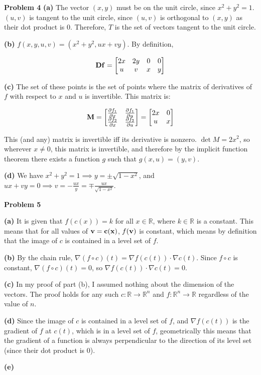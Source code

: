 \documentclass[11pt]{amsart}
\DeclareMathOperator{\detm}{det}
\newcommand{\problem}[1]{\bigskip\noindent\textbf{Problem #1}}
\newcommand{\ppart}[1]{\bigskip\textbf{(#1)}}
\begin{document}
\problem{4}
\ppart{a}
The vector $(x, y)$ must be on the unit circle, since $x^2 + y^2 = 1$. $(u, v)$ is tangent to the unit circle, since $(u, v)$ is orthogonal to $(x, y)$ as their dot product is $0$. Therefore, $T$ is the set of vectors tangent to the unit circle.

\ppart{b}
$f(x, y, u, v) = (x^2 + y^2, ux + vy)$. By definition,

$$
\bf{D}f =
\begin{bmatrix}
	2x & 2y & 0 & 0 \\
	u & v & x & y
\end{bmatrix}
$$

\ppart{c}
The set of these points is the set of points where the matrix of derivatives of $f$ with respect to $x$ and $u$ is invertible. This matrix is:

$$
\bf{M} =
\begin{bmatrix}
	\frac{\partial f_1}{\partial x} & \frac{\partial f_1}{\partial u} \\
	\frac{\partial f_2}{\partial x} & \frac{\partial f_2}{\partial u}
\end{bmatrix}
=
\begin{bmatrix}
	2x & 0 \\
	u & x
\end{bmatrix}
$$

This (and any) matrix is invertible iff its derivative is nonzero. $\detm M = 2x^2$, so wherever $x \neq 0$, this matrix is invertible, and therefore by the implicit function theorem there exists a function $g$ such that $g(x, u) = (y, v)$.

\ppart{d}
We have $x^2 + y^2 = 1 \implies y = \pm \sqrt{1 - x^2}$, and $ux + vy = 0 \implies v = -\frac{ux}{y} = \mp \frac{ux}{\sqrt{1 - x^2}}$.

\problem{5}

\ppart{a}
It is given that $f(c(x)) = k$ for all $x \in \mathbb{R}$, where $k \in \mathbb{R}$ is a constant. This means that for all values of $\bf{v} = c(x)$, $f(\bf{v})$ is constant, which means by definition that the image of $c$ is contained in a level set of $f$.

\ppart{b}
By the chain rule, $\nabla(f \circ c)(t) = \nabla f(c(t)) \cdot \nabla c(t)$. Since $f \circ c$ is constant, $\nabla(f \circ c)(t) = 0$, so $\nabla f(c(t)) \cdot \nabla c(t) = 0$.

\ppart{c}
In my proof of part (b), I assumed nothing about the dimension of the vectors. The proof holds for any such $c: \mathbb{R} \rightarrow \mathbb{R}^n$ and $f: \mathbb{R}^n \rightarrow \mathbb{R}$ regardless of the value of $n$.

\ppart{d}
Since the image of $c$ is contained in a level set of $f$, and $\nabla f(c(t))$ is the gradient of $f$ at $c(t)$, which is in a level set of $f$, geometrically this means that the gradient of a function is always perpendicular to the direction of its level set (since their dot product is 0).

\ppart{e}
\end{document}
